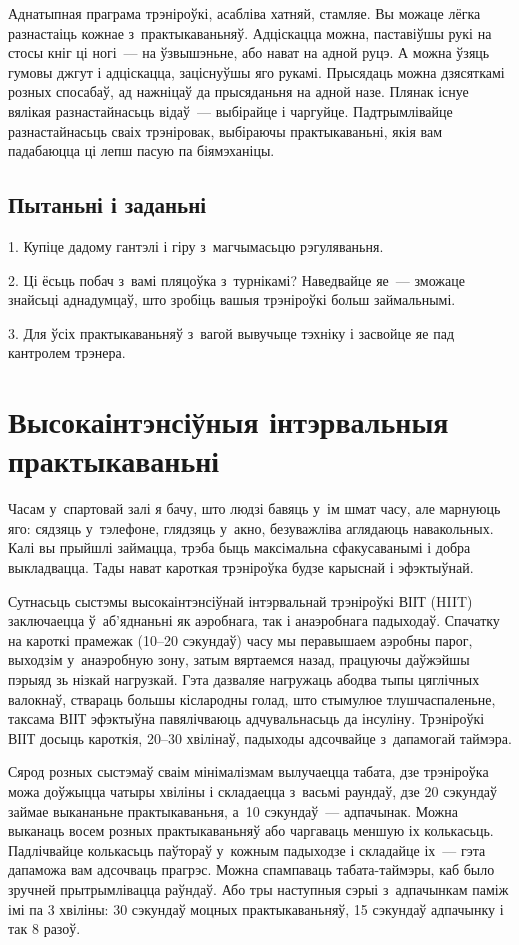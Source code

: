 Аднатыпная праграма трэніроўкі, асабліва хатняй, стамляе. Вы можаце лёгка разнастаіць кожнае з~практыкаваньняў. Адціскацца можна, паставіўшы рукі на стосы кніг ці ногі~--- на ўзвышэньне, або нават на адной руцэ. А можна ўзяць гумовы джгут і адціскацца, заціснуўшы яго рукамі. Прысядаць можна дзясяткамі розных спосабаў, ад нажніцаў да прысяданьня на адной назе. Плянак існуе вялікая разнастайнасьць відаў~--- выбірайце і чаргуйце. Падтрымлівайце разнастайнасьць сваіх трэніровак, выбіраючы практыкаваньні, якія вам падабаюцца ці лепш пасую па біямэханіцы.

\subsection*{Пытаньні і заданьні}

1. Купіце дадому гантэлі і гіру з~магчымасьцю рэгуляваньня.

2. Ці ёсьць побач з~вамі пляцоўка з~турнікамі? Наведвайце яе~--- зможаце знайсьці аднадумцаў, што зробіць вашыя трэніроўкі больш займальнымі.

3. Для ўсіх практыкаваньняў з~вагой вывучыце тэхніку і засвойце яе пад кантролем трэнера.


\section{Высокаінтэнсіўныя інтэрвальныя практыкаваньні}

Часам у~спартовай залі я бачу, што людзі бавяць у~ім шмат часу, але марнуюць яго: сядзяць у~тэлефоне, глядзяць у~акно, безуважліва аглядаюць навакольных. Калі вы прыйшлі займацца, трэба быць максімальна сфакусаванымі і добра выкладвацца. Тады нават кароткая трэніроўка будзе карыснай і эфэктыўнай.

Сутнасьць сыстэмы высокаінтэнсіўнай інтэрвальнай трэніроўкі ВІІТ (HIIT) заключаецца ў~аб'яднаньні як аэробнага, так і анаэробнага падыходаў. Спачатку на кароткі прамежак (10--20 сэкундаў) часу мы перавышаем аэробны парог, выходзім у~анаэробную зону, затым вяртаемся назад, працуючы даўжэйшы пэрыяд зь нізкай нагрузкай. Гэта дазваляе нагружаць абодва тыпы цяглічных валокнаў, ствараць большы кіслародны голад, што стымулюе тлушчаспаленьне, таксама ВІІТ эфэктыўна павялічваюць адчувальнасьць да інсуліну. Трэніроўкі ВІІТ досыць кароткія, 20--30 хвілінаў, падыходы адсочвайце з~дапамогай таймэра.

Сярод розных сыстэмаў сваім мінімалізмам вылучаецца табата, дзе трэніроўка можа доўжыцца чатыры хвіліны і складаецца з~васьмі раундаў, дзе 20 сэкундаў займае выкананьне практыкаваньня, а~10 сэкундаў~--- адпачынак. Можна выканаць восем розных практыкаваньняў або чаргаваць меншую іх колькасьць. Падлічвайце колькасьць паўтораў у~кожным падыходзе і складайце іх~--- гэта дапаможа вам адсочваць прагрэс. Можна спампаваць табата-таймэры, каб было зручней прытрымлівацца раўндаў. Або тры наступныя сэрыі з~адпачынкам паміж імі па 3 хвіліны: 30 сэкундаў моцных практыкаваньняў, 15 сэкундаў адпачынку і так 8 разоў.

